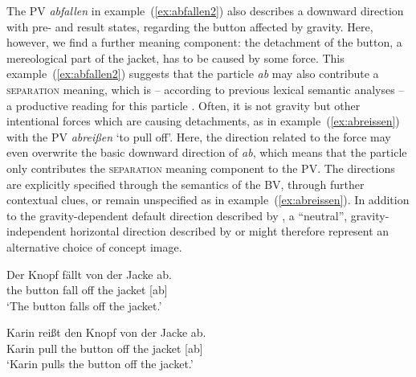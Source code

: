 \documentclass[output=paper]{langsci/langscibook}
\begin{document}
The PV \textit{abfallen} in example~(\ref{ex:abfallen2}) also
describes a downward direction with pre- and result states, regarding
the button affected by gravity. Here, however, we find a further meaning
component: the detachment of the button, a mereological part of the
jacket, has to be caused by some force. This
example~(\ref{ex:abfallen2}) suggests that the particle \textit{ab} may
also contribute a \textsc{separation} meaning, which is -- according to
previous lexical semantic analyses -- a productive reading for this
particle \citep{Kliche:11ALTER}. Often, it is not gravity but other
intentional forces which are causing detachments, as in
example~(\ref{ex:abreissen}) with the PV \textit{abreißen} `to pull
off'. Here, the direction related to the force may even overwrite the
basic downward direction of \textit{ab}, which means that the particle
only contributes the \textsc{separation} meaning component to the
PV. The directions are explicitly specified through the semantics of
the BV, through further contextual clues, or remain unspecified as in
example~(\ref{ex:abreissen}). In addition to the gravity-dependent
default direction described by , a ``neutral'',
gravity-independent horizontal direction described by
 or  might therefore represent an
alternative choice of concept image.

\ea\label{ex:abfallen2}
\gll Der Knopf fällt von der Jacke ab.\\
the button fall off the jacket [ab]\\
\glt `The button falls off the jacket.'  
\z

\ea\label{ex:abreissen}
\gll Karin reißt den Knopf von der Jacke ab.\\
Karin pull the button off the jacket [ab]\\
\glt `Karin pulls the button off the jacket.'
\z
\end{document}
